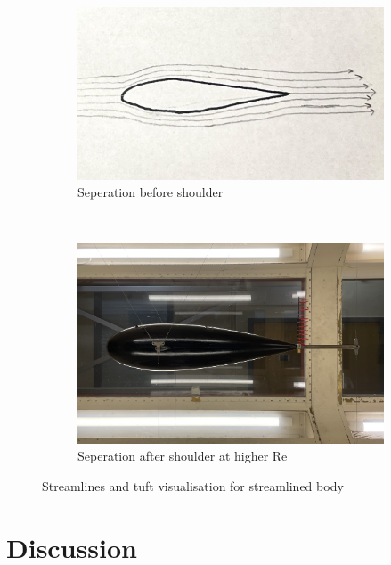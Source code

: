 \documentclass[8pt]{article}
\begin{document}
\begin{figure}[H]
    \centering
    \begin{subfigure}[t]{0.48\textwidth}
        \centering
        \includegraphics[width=1\textwidth]{Images_Videos/stream_streamlined_2.jpg}
        \caption{Seperation before shoulder}
        \label{fig:figure10}
    \end{subfigure}
    ~
    \begin{subfigure}[t]{0.42\textwidth}
        \centering
        \includegraphics[width=1\textwidth]{Images_Videos/Streamlined_8milibar.JPG}
        \caption{Seperation after shoulder at higher Re}
        \label{fig:figure11}
    \end{subfigure}
    \caption{Streamlines and tuft visualisation for streamlined body}
\end{figure}

\section{Discussion}
\end{document}
